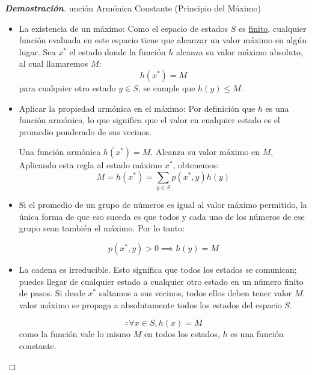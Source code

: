 \documentclass[10pt,a4paper]{article}
\begin{document}
\begin{proof}[\textbf{Demostración}]
    unción Armónica Constante (Principio del Máximo)
    
    \begin{itemize}
        \item La existencia de un máximo:
        Como el espacio de estados $S$ es \ul{finito}, cualquier función evaluada en este espacio
        tiene que alcanzar un valor máximo en algún lugar.
        Sea $x^{*}$ el estado donde la función $h$ alcanza su valor máximo absoluto, al cual 
        llamaremos $M$:
        \[ h(x^{*}) = M \]
        para cualquier otro estado $y \in S$, se cumple que $h(y) \leq M$.
        \item Aplicar la propiedad armónica en el máximo:
        Por definición que $h$ es una función armónica, lo que significa que el valor en cualquier
        estado es el promedio ponderado de sus vecinos. 

        \begin{alerta}{}
            Una función armónica $h(x^{*}) = M $. Alcanza su valor máximo en $M$, Aplicando esta regla al estado máximo $x^{*}$, obtenemos:
            \[ M = h(x^{*}) = \sum_{y \in S} p(x^{*}, y) h(y) \]
        \end{alerta}

        \item Si el promedio de un grupo de números es igual al valor máximo permitido, la única forma de que eso suceda es que todos y 
        cada uno de los números de ese grupo sean también el máximo.
        Por lo tanto:

        \[ p(x^{*}, y ) > 0 \implies h(y) = M \]

        \item La cadena es irreducible. Esto significa que todos los estados se comunican; puedes llegar de cualquier estado a cualquier otro estado en un número finito de pasos.
        Si desde $x^{*}$ saltamos a sus vecinos, todos ellos deben tener valor $M$.
        valor máximo se propaga a absolutamente todos los estados del espacio $S$.

        \[ \therefore \forall x \in S , h(x) = M \]
        como la función vale lo mismo $M$ en todos los estados, $h$ es una función constante. 

    \end{itemize}

\end{proof}

\newpage
\end{document}
